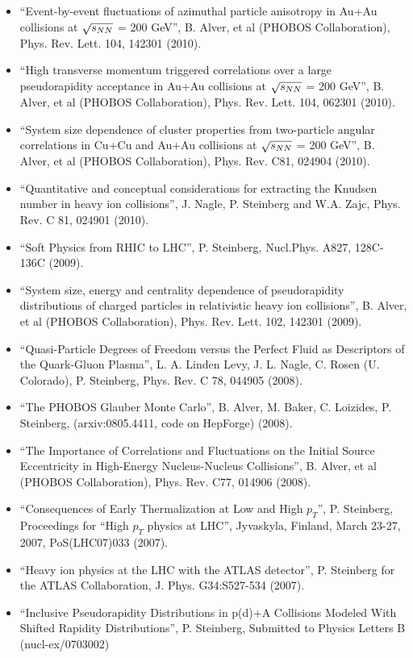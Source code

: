 \documentclass[11 pt]{article}
\begin{document}
\begin{description}
\begin{itemize}
\item ``Event-by-event fluctuations of azimuthal particle anisotropy in Au+Au collisions at $\sqrt{s_{NN}}$ = 200 GeV'', B. Alver, et al (PHOBOS Collaboration), Phys. Rev. Lett. 104, 142301 (2010).
\item ``High transverse momentum triggered correlations over a large pseudorapidity acceptance in   Au+Au collisions at $\sqrt{s_{NN}}$ = 200 GeV'', B. Alver, et al (PHOBOS Collaboration), Phys. Rev. Lett. 104, 062301 (2010).
\item ``System size dependence of cluster properties from two-particle angular correlations in Cu+Cu and Au+Au collisions at $\sqrt{s_{NN}}$ = 200 GeV'', B. Alver, et al (PHOBOS Collaboration), Phys. Rev. C81, 024904 (2010).
\item ``Quantitative and conceptual considerations for extracting the Knudsen number in heavy ion collisions'', J. Nagle, P. Steinberg and W.A. Zajc, Phys. Rev. C 81, 024901 (2010).
\item ``Soft Physics from RHIC to LHC'', P. Steinberg, Nucl.Phys. A827, 128C-136C (2009).
\item ``System size, energy and centrality dependence of pseudorapidity distributions of charged particles in relativistic heavy ion collisions'', B. Alver, et al (PHOBOS Collaboration), Phys. Rev. Lett. 102, 142301 (2009).
\item ``Quasi-Particle Degrees of Freedom versus the Perfect Fluid as Descriptors of the Quark-Gluon Plasma'', L. A. Linden Levy, J. L. Nagle, C. Rosen (U. Colorado), P. Steinberg, Phys. Rev. C 78, 044905 (2008).
\item ``The PHOBOS Glauber Monte Carlo'', B. Alver, M. Baker, C. Loizides, P. Steinberg, (arxiv:0805.4411, code on HepForge) (2008).
\item ``The Importance of Correlations and Fluctuations on the Initial Source Eccentricity in High-Energy Nucleus-Nucleus Collisions'', B. Alver, et al (PHOBOS Collaboration), Phys. Rev. C77, 014906 (2008).
\item ``Consequences of Early Thermalization at Low and High $p_T$'', P. Steinberg, Proceedings for ``High $p_T$ physics at LHC'', Jyvaskyla, Finland, March 23-27, 2007, PoS(LHC07)033 (2007).
\item ``Heavy ion physics at the LHC with the ATLAS detector'', P. Steinberg for the ATLAS Collaboration, J. Phys. G34:S527-534 (2007).
\item ``Inclusive Pseudorapidity Distributions in p(d)+A Collisions Modeled With Shifted Rapidity Distributions'', P. Steinberg, Submitted to Physics Letters B (nucl-ex/0703002)

\end{itemize}
\end{description}
\end{document}
